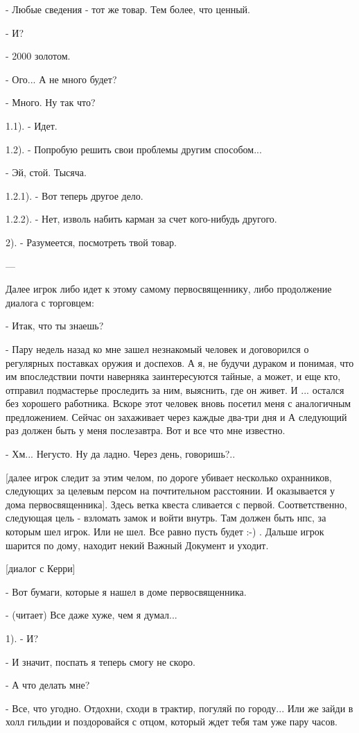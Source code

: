 \documentclass[12pt,a4paper]{book}
\begin{document}
- Любые сведения - тот же товар. Тем более, что ценный.

- И?

- 2000 золотом.

- Ого... А не много будет?

- Много. Ну так что?

1.1). - Идет.

1.2). - Попробую решить свои проблемы другим способом...

- Эй, стой. Тысяча.

1.2.1). - Вот теперь другое дело.

1.2.2). - Нет, изволь набить карман за счет кого-нибудь другого.

2). - Разумеется, посмотреть твой товар.

---

Далее игрок либо идет к этому самому первосвященнику, либо продолжение диалога с торговцем:

- Итак, что ты знаешь?

- Пару недель назад ко мне зашел незнакомый человек и договорился о регулярных поставках оружия и доспехов. А я, не будучи дураком и понимая, что им впоследствии почти наверняка заинтересуются тайные, а может, и еще кто, отправил подмастерье проследить за ним, выяснить, где он живет. И ... остался без хорошего работника. Вскоре этот человек вновь посетил меня с аналогичным предложением. Сейчас он захаживает через каждые два-три дня и А следующий раз должен быть у меня послезавтра. Вот и все что мне известно.

- Хм... Негусто. Ну да ладно. Через день, говоришь?..

[далее игрок следит за этим челом, по дороге убивает несколько охранников, следующих за целевым персом на почтительном расстоянии. И оказывается у дома первосвященника]. Здесь ветка квеста сливается с первой. Соответственно, следующая цель - взломать замок и войти внутрь. Там должен быть нпс, за которым шел игрок. Или не шел. Все равно пусть будет :-) . Дальше игрок шарится по дому, находит некий Важный Документ и уходит.

[диалог с Керри]

- Вот бумаги, которые я нашел в доме первосвященника.

- (читает) Все даже хуже, чем я думал...

1). - И?

- И значит, поспать я теперь смогу не скоро.

- А что делать мне?

- Все, что угодно. Отдохни, сходи в трактир, погуляй по городу... Или же зайди в холл гильдии и поздоровайся с отцом, который ждет тебя там уже пару часов.
\end{document}
